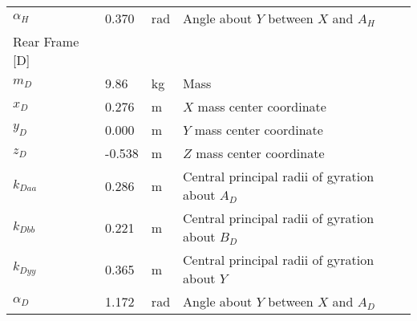 \documentclass{bmd2019p}
\begin{document}
\begin{table}
\begin{tabular}{llll}
    $\alpha_H$ & 0.370 & \si{\radian} & Angle about $Y$ between $X$ and $A_H$ \\
    Rear Frame [D] & & \\
    \midrule
    $m_D$ &  9.86 & \si{\kilogram}    & Mass \\
    $x_D$ &  0.276 & \si{\meter}      & $X$ mass center coordinate \\
    $y_D$ & 0.000 & \si{\meter}             & $Y$ mass center coordinate \\
    $z_D$ & -0.538 & \si{\meter}      & $Z$ mass center coordinate \\
    $k_{Daa}$ &  0.286 & \si{\meter}  & Central principal radii of gyration about $A_D$ \\
    $k_{Dbb}$ &  0.221 & \si{\meter}  & Central principal radii of gyration about $B_D$ \\
    $k_{Dyy}$ &  0.365 & \si{\meter}  & Central principal radii of gyration about $Y$ \\
    $\alpha_D$ &  1.172 & \si{\radian} & Angle about $Y$ between $X$ and $A_D$ \\
    \bottomrule
  \end{tabular}
\end{table}
\end{document}
